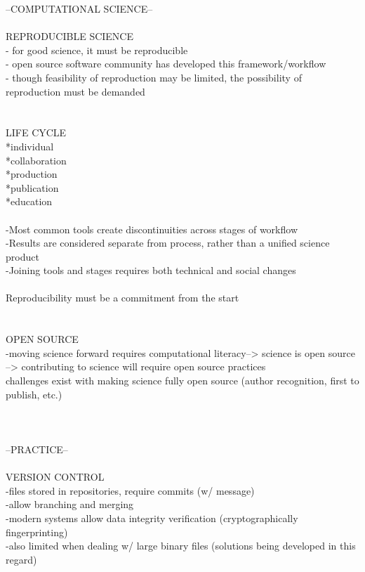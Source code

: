 \documentclass{report}
\begin{document}
--COMPUTATIONAL SCIENCE--\\
\-\\
REPRODUCIBLE SCIENCE\\
- for good science, it must be reproducible\\
- open source software community has developed this framework/workflow\\
- though feasibility of reproduction may be limited, the possibility of reproduction must be demanded\\
\-\\
\-\\
LIFE CYCLE\\
*individual\\
*collaboration\\
*production\\
*publication\\
*education\\
\-\\
-Most common tools create discontinuities across stages of workflow\\
-Results are considered separate from process, rather than a unified science product\\
-Joining tools and stages requires both technical and social changes\\
\-\\
Reproducibility must be a commitment from the start\\
\-\\
\-\\
OPEN SOURCE\\
-moving science forward requires computational literacy--> science is open source --> contributing to science will require open source practices\\
challenges exist with making science fully open source (author recognition, first to publish, etc.)\\
\-\\
\-\\
\-\\
--PRACTICE--\\
\-\\
VERSION CONTROL\\
-files stored in repositories, require commits (w/ message)\\
-allow branching and merging\\
-modern systems allow data integrity verification (cryptographically fingerprinting)\\
-also limited when dealing w/ large binary files (solutions being developed in this regard)\\ 
\end{document}
